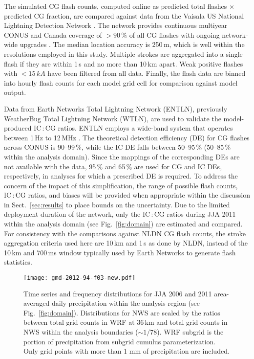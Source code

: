 The simulated CG flash counts, computed online as predicted total flashes
$\times$ predicted CG fraction, are compared against data from the Vaisala
US National Lightning Detection Network \citep[NLDN;][]{5173582}. The
network provides continuous multiyear CONUS and Canada coverage of
$>90\,{\%}$ of all CG flashes with ongoing network-wide upgrades
\citep{Orville:2002uq,Orville:2010uq}. The median location accuracy is
250\,\unit{m}, which is well within the resolutions employed in this study.
Multiple strokes are aggregated into a single flash if they are within 1\,s and no more than 10\,\unit{km} apart. Weak positive flashes with
$<15\,\unit{kA}$ have been filtered from all data. Finally, the flash data
are binned into hourly flash counts for each model grid cell for comparison
against model output.

Data from Earth Networks Total Lightning Network (ENTLN), previously
WeatherBug Total Lightning Network (WTLN), are used to validate the
model-produced IC\,:\,CG ratios. ENTLN employs a wide-band system that
operates between 1\,\unit{Hz} to 12\,\unit{MHz} \citep{Liu:2011vn}. The
theoretical detection efficiency (DE) for CG flashes across CONUS is
90--99\,{\%}, while the IC DE falls between 50--95\,{\%} (50--85\,{\%} within
the analysis domain). Since the mappings of the corresponding DEs are not
available with the data, 95\,{\%} and 65\,{\%} are used for CG and IC DEs,
respectively, in analyses for which a prescribed DE is required. To address
the concern of the impact of this simplification, the range of possible flash
counts, IC\,:\,CG ratios, and biases will be provided when appropriate within
the discussion in Sect.~\ref{sec:results} to place bounds on the
uncertainty. Due to the limited deployment duration of the network, only the
IC\,:\,CG ratios during JJA 2011 within the analysis domain (see
Fig.~\ref{fig:domain}) are estimated and compared. For consistency with the
comparisons against NLDN CG flash counts, the stroke aggregation criteria
used here are 10\,\unit{km} and 1\,s as done by NLDN, instead of the
10\,\unit{km} and 700\,\unit{ms} window typically used by Earth Networks to
generate flash statistics.

\begin{figure*}[t]
      \texttt{[image: gmd-2012-94-f03-new.pdf]}
      \caption{Time series and frequency distributions for JJA 2006
          and 2011 area-averaged daily precipitation within the
          analysis region (see Fig.~\ref{fig:domain}). Distributions
          for NWS are scaled by the ratios between total grid counts in
          WRF at 36\,\unit{km} and total grid counts in NWS within the
          analysis boundaries ($\sim1/78$). WRF subgrid is the portion
          of precipitation from subgrid cumulus parameterization. Only
          grid points with more than 1 mm of precipitation are
          included.}
      \label{fig:precipseries}
      \label{fig:precipseries}
\end{figure*}



